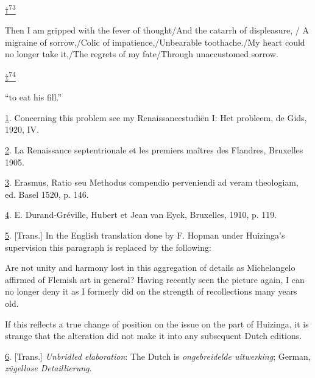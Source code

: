 \protect\hypertarget{23_NOTES.xhtmlux5cux23id_2808}{\protect\hyperlink{21_Chapter_Thirteen__IMAGE_AND_WORD.xhtmlux5cux23id_2807}{†\textsuperscript{73}}}
Then I am gripped with the fever of thought/And the catarrh of
displeasure, / A migraine of sorrow,/Colic of impatience,/Unbearable
toothache./My heart could no longer take it,/The regrets of my
fate/Through unaccustomed sorrow.

\protect\hypertarget{23_NOTES.xhtmlux5cux23id_2806}{\protect\hyperlink{21_Chapter_Thirteen__IMAGE_AND_WORD.xhtmlux5cux23id_2805}{‡\textsuperscript{74}}}
``to eat his fill.''

\protect\hypertarget{23_NOTES.xhtmlux5cux23id_307}{\protect\hyperlink{21_Chapter_Thirteen__IMAGE_AND_WORD.xhtmlux5cux23id_306}{1}}.
Concerning this problem see my Renaissancestudiën I: Het probleem, de
Gids, 1920, IV.

\protect\hypertarget{23_NOTES.xhtmlux5cux23id_305}{\protect\hyperlink{21_Chapter_Thirteen__IMAGE_AND_WORD.xhtmlux5cux23id_304}{2}}.
La Renaissance septentrionale et les premiers maîtres des Flandres,
Bruxelles 1905.

\protect\hypertarget{23_NOTES.xhtmlux5cux23id_303}{\protect\hyperlink{21_Chapter_Thirteen__IMAGE_AND_WORD.xhtmlux5cux23id_302}{3}}.
Erasmus, Ratio seu Methodus compendio perveniendi ad veram theologiam,
ed. Basel 1520, p. 146.

\protect\hypertarget{23_NOTES.xhtmlux5cux23id_301}{\protect\hyperlink{21_Chapter_Thirteen__IMAGE_AND_WORD.xhtmlux5cux23id_300}{4}}.
E. Durand-Gréville, Hubert et Jean van Eyck, Bruxelles, 1910, p. 119.

\protect\hypertarget{23_NOTES.xhtmlux5cux23page_435}{\protect\hyperlink{21_Chapter_Thirteen__IMAGE_AND_WORD.xhtmlux5cux23id_299}{5}}.
{[}Trans.{]} In the English translation done by F. Hopman under
Huizinga's supervision this paragraph is replaced by the following:

Are not unity and harmony lost in this aggregation of details as
Michelangelo affirmed of Flemish art in general? Having recently seen
the picture again, I can no longer deny it as I formerly did on the
strength of recollections many years old.

If this reflects a true change of position on the issue on the part of
Huizinga, it is strange that the alteration did not make it into any
subsequent Dutch editions.

\protect\hypertarget{23_NOTES.xhtmlux5cux23id_298}{\protect\hyperlink{21_Chapter_Thirteen__IMAGE_AND_WORD.xhtmlux5cux23id_297}{6}}.
{[}Trans.{]} \emph{Unbridled elaboration}: The Dutch is
\emph{ongebreidelde uitwerking}; German, \emph{zügellose Detaillierung}.

